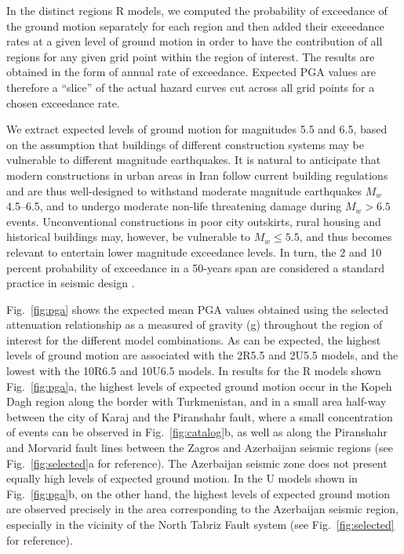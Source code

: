 In the distinct regions R models, we computed the probability of exceedance of the ground motion separately for each region and then added their exceedance rates at a given level of ground motion in order to have the contribution of all regions for any given grid point within the region of interest. The results are obtained in the form of annual rate of exceedance. Expected PGA values are therefore a ``slice'' of the actual hazard curves cut across all grid points for a chosen exceedance rate.

We extract expected levels of ground motion for magnitudes 5.5 and 6.5, based on the assumption that buildings of different construction systems may be vulnerable to different magnitude earthquakes. It is natural to anticipate that modern constructions in urban areas in Iran follow current building regulations and are thus well-designed to withstand moderate magnitude earthquakes $M_w$ 4.5--6.5, and to undergo moderate non-life threatening damage during $M_w > 6.5$ events. Unconventional constructions in poor city outskirts, rural housing and historical buildings may, however, be vulnerable to $M_w \leq 5.5$, and thus becomes relevant to entertain lower magnitude exceedance levels. In turn, the 2 and 10 percent probability of exceedance in a 50-years span are considered a standard practice in seismic design \citep[e.g.,][]{BHRC2014}.

Fig.~\ref{fig:pga} shows the expected mean PGA values obtained using the selected attenuation relationship as a measured of gravity (g) throughout the region of interest for the different model combinations. As can be expected, the highest levels of ground motion are associated with the 2R5.5 and 2U5.5 models, and the lowest with the 10R6.5 and 10U6.5 models. In results for the R models shown Fig.~\ref{fig:pga}a, the highest levels of expected ground motion occur in the Kopeh Dagh region along the border with Turkmenistan, and in a small area half-way between the city of Karaj and the Piranshahr fault, where a small concentration of events can be observed in Fig.~\ref{fig:catalog}b, as well as along the Piranshahr and Morvarid fault lines between the Zagros and Azerbaijan seismic regions (see Fig.~\ref{fig:selected}a for reference). The Azerbaijan seismic zone does not present equally high levels of expected ground motion. In the U models shown in Fig.~\ref{fig:pga}b, on the other hand, the highest levels of expected ground motion are observed precisely in the area corresponding to the Azerbaijan seismic region, especially in the vicinity of the North Tabriz Fault system (see Fig.~\ref{fig:selected} for reference).

